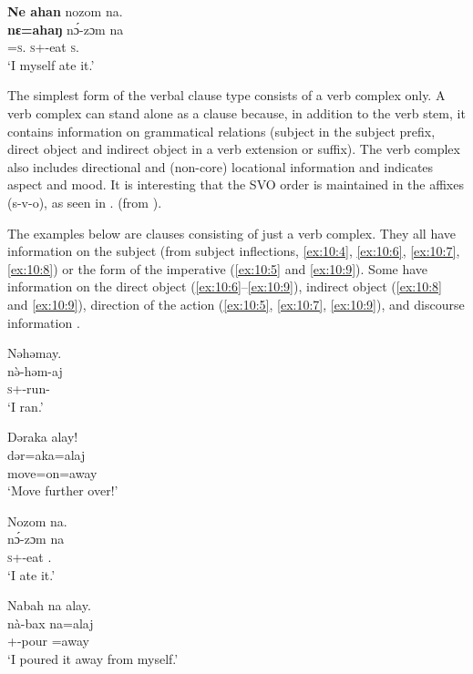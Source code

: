 \ea \label{ex:10:3}
\textbf{Ne  ahan}  nozom  na.\\
\gll  \textbf{nɛ}\textbf{=ahaŋ}     n\'{ɔ}-zɔm    na\\
      {\oneS}=\textsc{s}.{\POSS}  \textsc{s}+{\PFV}-eat  \textsc{s}.{\DO}\\
\glt  ‘I myself ate it.’
\z

The simplest form of the verbal clause type consists of a verb complex only. A verb complex can stand alone as a clause because, in addition to the verb stem, it contains information on grammatical relations (subject in the subject prefix, direct object and indirect object in a verb extension or suffix). The verb complex also includes directional and (non-core) locational information and indicates aspect and mood. It is interesting that the SVO order is maintained in the affixes (s-v-o), as seen in . (from ).

The examples below are clauses consisting of just a verb complex. They all have information on the subject (from subject inflections, \ref{ex:10:4}, \ref{ex:10:6}, \ref{ex:10:7}, \ref{ex:10:8}) or the form of the imperative (\ref{ex:10:5} and \ref{ex:10:9}). Some have information on the direct object (\ref{ex:10:6}--\ref{ex:10:9}), indirect object (\ref{ex:10:8} and \ref{ex:10:9}), direction of the action (\ref{ex:10:5}, \ref{ex:10:7}, \ref{ex:10:9}), and discourse information .  

\ea \label{ex:10:4}
Nəhəmay.\\
\gll  n\`{ə}-həm-aj\\
      \textsc{s}+{\PFV}-run-\CL\\
\glt  ‘I ran.’
\z

\ea \label{ex:10:5}
Dəraka  alay!\\
\gll  dər=aka=alaj\\
      move=on=away\\
\glt  ‘Move further over!’
\z

\ea \label{ex:10:6}
\glll Nozom  na.\\
      n\'{ɔ}-zɔm    na\\
      \textsc{s}+{\PFV}-eat    \SSS.\DO\\
\glt  ‘I ate it.’
\z

\ea \label{ex:10:7}
Nabah  na  alay. \\
\gll  nà-bax     na=alaj \\
      {\oneS}+{\PFV}-pour {\DO}=away\\
\glt  ‘I poured it away from myself.’
\z

